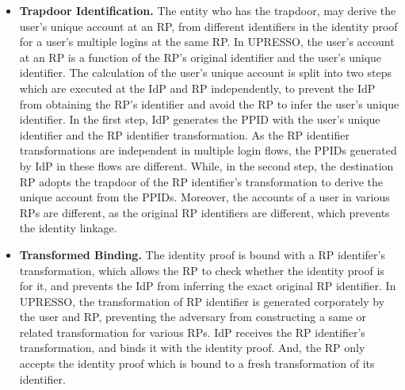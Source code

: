 \begin{itemize}
\item \textbf{Trapdoor Identification.} The entity who has the trapdoor, 
may derive the user's unique account at an RP, from different identifiers in the identity proof for a user's multiple logins at the same RP.
In UPRESSO, the user's account at an RP is a function of the RP's original identifier and the user's unique identifier. 
The calculation of the user's unique account is split into two steps which are executed at the IdP and RP independently, 
 to prevent the IdP from obtaining the RP's identifier and avoid the RP to infer the user's unique identifier. 
In the first step, IdP generates the PPID with the user's unique identifier and the RP identifier transformation. As the RP identifier transformations are independent in multiple login flows, the PPIDs generated by IdP in these flows are different. 
While, in the second step, the destination RP adopts the trapdoor of the RP identifier's transformation to derive the unique account from the PPIDs. 
Moreover, the accounts of a user in various RPs are different, as the original RP identifiers are different, which prevents the identity linkage.

\item \textbf{Transformed Binding.} 
The identity proof is bound with a RP identifer's transformation, 
    which allows the RP to check whether the identity proof is for it, and prevents the IdP from inferring the exact original RP identifier.
In UPRESSO, the transformation of RP identifier is generated corporately by the user and RP, preventing the adversary from constructing a same or related transformation for various RPs.
IdP receives the RP identifier's transformation, and binds it with the identity proof.
And, the RP only accepts the identity proof which is bound to a fresh transformation of its identifier. 


\end{itemize}
